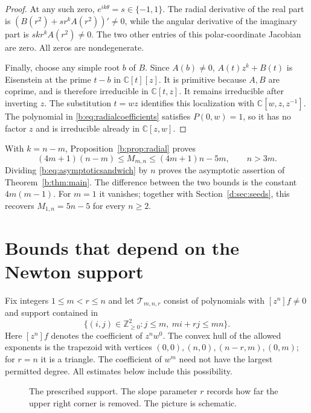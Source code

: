 \documentclass[UTF8,11pt]{ctexart}
\theoremstyle{definition}
\numberwithin{equation}{section}
\newcommand{\C}{\mathbb C}\newcommand{\R}{\mathbb R}
\newcommand{\Tcal}{\mathcal T}\newcommand{\Ccal}{\mathcal C}
\begin{document}
\begin{proof}
At any such zero, $e^{ik\theta}=s\in\{-1,1\}$.
The radial derivative of the real part is
$(B(r^2)+s r^kA(r^2))'\ne0$, while the angular derivative of the
imaginary part is $sk r^kA(r^2)\ne0$. The two other entries of
this polar-coordinate Jacobian are zero. All zeros are nondegenerate.

Finally, choose any simple root $b$ of $B$. Since $A(b)\ne0$,
$A(t)z^k+B(t)$ is Eisenstein at the prime $t-b$ in $\C[t][z]$.
It is primitive because $A,B$ are coprime, and is therefore
irreducible in $\C[t,z]$. It remains irreducible after inverting $z$.
The substitution $t=wz$ identifies this localization with
$\C[w,z,z^{-1}]$. The polynomial in \eqref{b:eq:radialcoefficients}
satisfies $P(0,w)=1$, so it has no factor $z$ and is irreducible
already in $\C[z,w]$.
\end{proof}

With $k=n-m$, Proposition~\ref{b:prop:radial} proves
\begin{equation}\label{b:eq:asymptoticsandwich}
 (4m+1)(n-m)\le M_{m,n}\le(4m+1)n-5m,
 \qquad n>3m.
\end{equation}
Dividing \eqref{b:eq:asymptoticsandwich} by $n$ proves
the asymptotic assertion of Theorem~\ref{b:thm:main}.
The difference between the two bounds is the constant $4m(m-1)$.
For $m=1$ it vanishes; together with Section~\ref{d:sec:seeds}, this recovers
$M_{1,n}=5n-5$ for every $n\ge2$.

\section{Bounds that depend on the Newton support}\label{n:sec:support}
Fix integers $1\le m<r\le n$ and let
$\Tcal_{m,n,r}$ consist of polynomials with $[z^n]f\ne0$ and support contained
in
\begin{equation}\label{n:eq:support}
 \{(i,j)\in\mathbb Z_{\ge0}^2: j\le m,\ mi+rj\le mn\}.
\end{equation}
Here $[z^n]f$ denotes the coefficient of $z^nw^0$.
The convex hull of the allowed exponents is the trapezoid with vertices
$(0,0),(n,0),(n-r,m),(0,m)$; for $r=n$ it is a triangle.
The coefficient of $w^m$ need not have the largest permitted degree.
All estimates below include this possibility.

\begin{figure}[ht]
\centering
{}
\caption{The prescribed support. The slope parameter $r$ records how far the
upper right corner is removed. The picture is schematic.}
\label{n:fig:polygon}
\end{figure}
\end{document}
